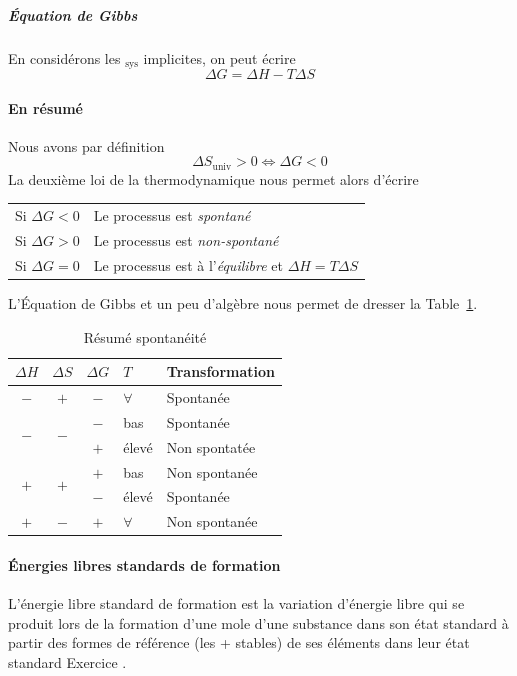 \documentclass[11pt,a4paper,french]{article}
\begin{document}
\subparagraph{\'Equation de Gibbs} En considérons les $_\mathrm{sys}$ implicites, on peut écrire
$$\Delta G=\Delta H-T\Delta S$$

\paragraph{En résumé}
Nous avons par définition
\[ \Delta S_\mathrm{univ} > 0 \Leftrightarrow \Delta G < 0 \]
La deuxième loi de la thermodynamique nous permet alors d'écrire
\begin{center}
	\begin{tabular}{ll}
		Si $\Delta G < 0$ & Le processus est \emph{spontané}\\
		Si $\Delta G > 0$ & Le processus est \emph{non-spontané}\\
		Si $\Delta G = 0$ & Le processus est à l'\emph{équilibre} et $\Delta H=T\Delta S$
	\end{tabular}
\end{center}

L'\'Equation de Gibbs et un peu d'algèbre nous permet de dresser la Table~\ref{tab:hsgt}.
\begin{table}[ht!]
	\begin{center}
		\begin{tabular}{|cccll|}
			\hline
			$\Delta H$ & $\Delta S$ & $\Delta G$ & $T$ & Transformation\\
			\hline
			$-$ & $+$ & $-$ & $\forall$ & Spontanée\\
			\hline
			\multirow{2}{*}{$-$} & \multirow{2}{*}{$-$} & $-$ & bas & Spontanée\\
			& & $+$ & élevé & Non spontatée\\
			\hline
			\multirow{2}{*}{$+$} & \multirow{2}{*}{$+$} & $+$ & bas & Non spontanée\\
			& & $-$ & élevé & Spontanée\\
			\hline
			$+$ & $-$ & $+$ & $\forall$ & Non spontanée\\
			\hline
		\end{tabular}
	\end{center}
	\caption{Résumé spontanéité}
	\label{tab:hsgt}
\end{table}

\paragraph{\'Energies libres standards de formation} L'énergie libre standard de formation est la variation d'énergie libre qui se produit lors de la formation d'une mole d'une substance dans son état standard à partir des formes de référence (les + stables) de ses éléments dans leur état standard Exercice \cite[p.~28]{legras}.
\end{document}
